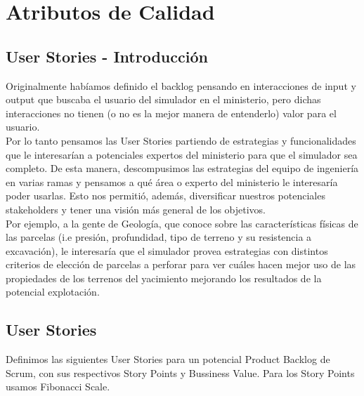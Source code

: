 \section{Atributos de Calidad}

\newcommand{\BV}[0]{Business Value}
\newcommand{\SP}{Story Points}
\newcommand{\US}[1]{\textbf{US #1}}
\newcommand{\fixme}[1]{\large\textcolor{red}{#1}}

\subsection{User Stories - Introducción}

Originalmente habíamos definido el backlog pensando en interacciones de input y output que buscaba el usuario del simulador en el ministerio, pero dichas interacciones no tienen (o no es la mejor manera de entenderlo) valor para el usuario.
\\

Por lo tanto pensamos las User Stories partiendo de estrategias y funcionalidades que le interesarían a potenciales expertos del ministerio para que el simulador sea completo. De esta manera, descompusimos las estrategias del equipo de ingeniería en varias ramas y pensamos a qué área o experto del ministerio le interesaría poder usarlas. Esto nos permitió, además, diversificar nuestros potenciales stakeholders y tener una visión más general de los objetivos.
\\

Por ejemplo, a la gente de Geología, que conoce sobre las características físicas de las parcelas (i.e presión, profundidad, tipo de terreno y su resistencia a excavación), le interesaría que el simulador provea estrategias con distintos criterios de elección de parcelas a perforar para ver cuáles hacen mejor uso de las propiedades de los terrenos del yacimiento mejorando los resultados de la potencial explotación.

\subsection{User Stories}

Definimos las siguientes User Stories para un potencial Product Backlog de Scrum, con sus respectivos Story Points y Bussiness Value. Para los Story Points usamos Fibonacci Scale.

